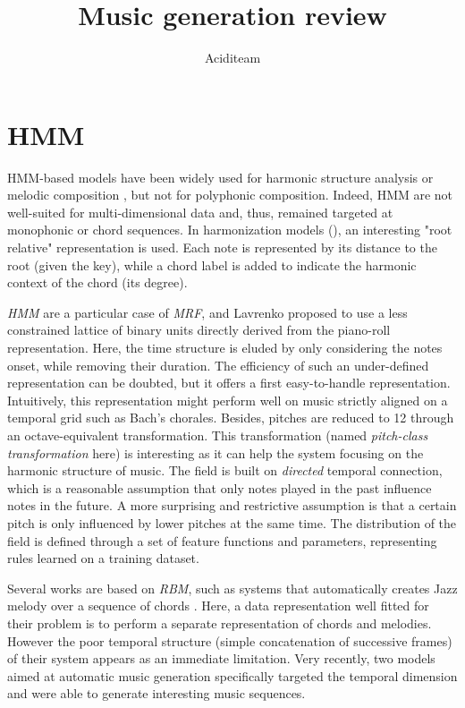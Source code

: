 \documentclass{report}
\title{Music generation review}
\author{Aciditeam}
\begin{document}
\maketitle

\section{HMM}
HMM-based models have been widely used for harmonic structure analysis \cite{allan2005harmonising,pickens2003polyphonic,pachet2001musical} or melodic composition \cite{Yamanishi:2010aa}, but not for polyphonic composition. Indeed, HMM are not well-suited for multi-dimensional data and, thus, remained targeted at monophonic or chord sequences. In harmonization models (\cite{allan2005harmonising}), an interesting "root relative" representation is used. Each note is represented by its distance to the root (given the key), while a chord label is added to indicate the harmonic context of the chord (its degree).

\textit{HMM} are a particular case of \textit{MRF}, and Lavrenko proposed to use a less constrained lattice of binary units directly derived from the piano-roll representation\cite{lavrenko2003polyphonic}. Here, the time structure is eluded by only considering the notes onset, while removing their duration. The efficiency of such an under-defined representation can be doubted, but it offers a first easy-to-handle representation. Intuitively, this representation might perform well on music strictly aligned on a temporal grid such as Bach's chorales. Besides, pitches are reduced to 12 through an octave-equivalent transformation. This transformation (named \textit{pitch-class transformation} here) is interesting as it can help the system focusing on the harmonic structure of music.
The field is built on \textit{directed} temporal connection, which is a reasonable assumption that only notes played in the past influence notes in the future. A more surprising and restrictive assumption is that a certain pitch is only influenced by lower pitches at the same time. The distribution of the field is defined through a set of feature functions and parameters, representing rules learned on a training dataset.

Several works are based on \textit{RBM}, such as systems that automatically creates Jazz melody over a sequence of chords \cite{bickerman2010learning}. Here, a data representation well fitted for their problem is to perform a separate representation of chords and melodies. However the poor temporal structure (simple concatenation of successive frames) of their system appears as an immediate limitation. Very recently, two models aimed at automatic music generation specifically targeted the temporal dimension and were able to generate interesting music sequences.
\end{document}
